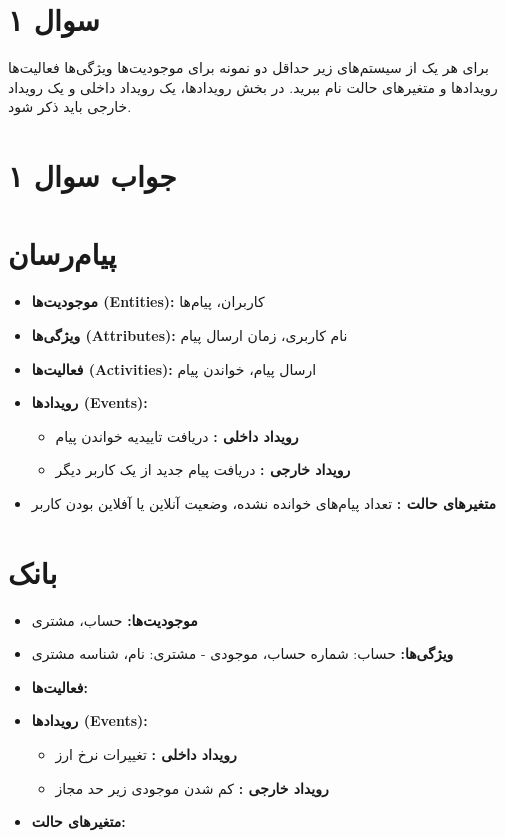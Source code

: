 \section*{سوال ۱}

برای هر یک از سیستم‌های زیر حداقل دو نمونه برای موجودیت‌ها 
ویژگی‌ها 
فعالیت‌ها 
رویدادها 
و متغیرهای حالت 
نام ببرید. در بخش رویدادها، یک رویداد داخلی 
و یک رویداد خارجی 
باید ذکر شود.

\section*{جواب سوال ۱}

\section*{پیام‌رسان}
\begin{itemize}
	\item \textbf{موجودیت‌ها (Entities):} کاربران، پیام‌ها
	\item \textbf{ویژگی‌ها (Attributes):} نام کاربری، زمان ارسال پیام
	\item \textbf{فعالیت‌ها (Activities):} ارسال پیام، خواندن پیام
	\item \textbf{رویدادها (Events):} 
	\begin{itemize}
		\item \textbf{رویداد داخلی :} دریافت تاییدیه خواندن پیام
		\item \textbf{رویداد خارجی :} دریافت پیام جدید از یک کاربر دیگر
	\end{itemize}
	\item \textbf{متغیرهای حالت :} تعداد پیام‌های خوانده نشده، وضعیت آنلاین یا آفلاین بودن کاربر
\end{itemize}

\section*{بانک}
\begin{itemize}
	\item \textbf{موجودیت‌ها:} حساب، مشتری
	\item \textbf{ویژگی‌ها:} حساب: شماره حساب، موجودی - مشتری: نام، شناسه مشتری
	\item \textbf{فعالیت‌ها:} 
	\item \textbf{رویدادها (Events):}
	\begin{itemize}
		\item \textbf{رویداد داخلی  :} تغییرات نرخ ارز
		\item \textbf{رویداد خارجی  :} کم شدن موجودی زیر حد مجاز
	\end{itemize}
	\item \textbf{متغیرهای حالت:} 
\end{itemize}

